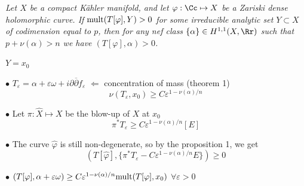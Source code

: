 \begin{slide}
\par\vspace{\bigskipamount}\noindent

 {\sl Let $X$ be a compact K\"ahler 
manifold, and let $\varphi:{\Cc}\mapsto X$ be a Zariski dense holomorphic curve.
If ${\rm mult}(T[\varphi], Y)> 0$ for some irreducible analytic set $Y\subset X$ of codimension equal to $p$, 
then for any nef class $\{\alpha\}\in H^{1, 1}(X, \Rr)$ such that $p+ \nu(\alpha)> n$
we have $(T[\varphi], \alpha)> 0$.}

\par\vspace{\bigskipamount}\noindent
{} \hskip 0.3cm$Y= x_0$ 

$\bullet$ 
$T_\varepsilon= \alpha+ \varepsilon\omega+ i\partial\overline\partial f_\varepsilon$
\hskip 0.3cm $\Longleftarrow$  \hskip 0.3cm concentration of mass (theorem 1) 
$$\nu(T_\varepsilon, x_0)\geq C\varepsilon^{1-\nu(\alpha)/n}$$ 

$\bullet$ Let $\pi:\widehat X\mapsto X$ be the blow-up of $X$ at $x_0$
$$\pi^*T_\varepsilon\geq C\varepsilon^{1-\nu(\alpha)/n}[E]$$ 
\par\vspace{\bigskipamount}\noindent
$\bullet$ The curve 
$\widehat \varphi$ is still non-degenerate, so by the proposition 1, we get
$$(T[\widehat \varphi], \{\pi^*T_\varepsilon- C\varepsilon^{1-\nu(\alpha)/n}E\})\geq 0$$
\par\vspace{\bigskipamount}\noindent
$\bullet$
$(T[\varphi], \alpha+ \varepsilon\omega)\geq C\varepsilon^{1-\nu(\alpha)/n}{\rm mult}(T[\varphi], x_0)$ \hskip 0.3cm $\forall \varepsilon> 0$



\end{slide}


